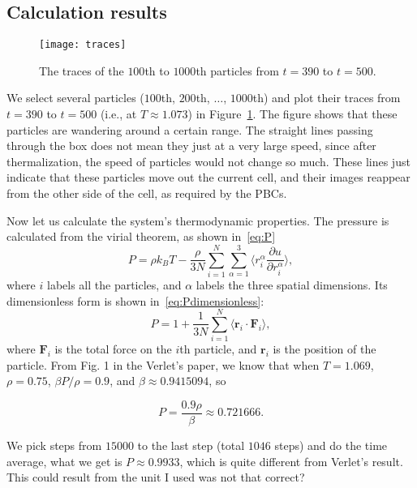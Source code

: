 \subsection{Calculation results}

\begin{figure}[H]
    \centering
    \texttt{[image: traces]}
    \caption{The traces of the \(100\)th to \(1000\)th particles from \(t = 390\) to \(t = 500\).}
    \label{fig:traces}
\end{figure}

We select several particles (\(100\)th, \(200\)th, \(\ldots\), \(1000\)th) and plot their traces
from \(t = 390\) to \(t = 500\) (i.e., at \(T \approx 1.073\)) in Figure~\ref{fig:traces}.
The figure shows that these particles are wandering around a certain
range. The straight lines passing through the box does not mean they just at a very
large speed, since after thermalization, the speed of particles would not change so
much. These lines just indicate that these particles move out the current cell,
and their images reappear from the other side of the cell, as required by the PBCs.

Now let us calculate the  system's thermodynamic properties.
The pressure is calculated from the virial theorem, as shown in~\eqref{eq:P}
%
\begin{equation}\label{eq:P}
    P = \rho k_B T - \frac{ \rho }{ 3N } \sum_{i=1}^{N} \sum_{\alpha=1}^{3}
    \biggl \langle r_i^\alpha \frac{ \partial u }{ \partial r_i^\alpha } \biggr \rangle,
\end{equation}
%
where \(i\) labels all the particles, and \(\alpha\) labels the three spatial dimensions.
Its dimensionless form is shown in~\eqref{eq:Pdimensionless}\cite{thijssen_2007}:
%
\begin{equation}\label{eq:Pdimensionless}
    P = 1 + \frac{ 1 }{ 3N } \sum_{i=1}^{N}
    \langle \bm{r}_i \cdot \bm{F}_i \rangle,
\end{equation}
%
where \(\bm{F}_i\) is the total force on the \(i\)th particle, and \(\bm{r}_i\) is the
position of the particle.
From Fig. 1 in the Verlet's paper\cite{Verlet}, we know that when \(T = 1.069\),
\(\rho = 0.75\), \(\beta P / \rho = 0.9\), and \(\beta \approx 0.9415094\), so

\begin{equation}
    P = \frac{ 0.9 \rho }{ \beta } \approx 0.721666.
\end{equation}

We pick steps from \(15000\) to the last step (total \(1046\) steps) and do the time average,
what we get is \(P \approx 0.9933\), which is quite different from Verlet's result.
This could result from the unit I used was not that correct?

